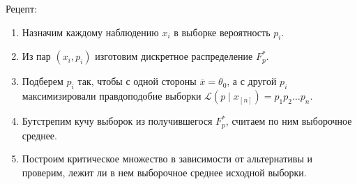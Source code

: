 \documentclass[11pt]{book}
\begin{document}
Рецепт:
\begin{enumerate}
	\item Назначим каждому наблюдению $x_i$ в выборке вероятность $p_i$.
	\item Из пар $(x_i, p_i)$ изготовим дискретное распределение $F^*_p$.
	\item Подберем $p_i$ так, чтобы с одной стороны $\overline{x} = \theta_0$, а с другой $p_i$ максимизировали правдоподобие выборки $\mathcal{L}(p \mid x_{[n]}) = p_1 p_2 \ldots p_{n}$.
	\item Бутстрепим кучу выборок из получившегося $F_{p}^{*}$, считаем по ним выборочное среднее.
	\item Построим критическое множество в зависимости от альтернативы и проверим, лежит ли в нем выборочное среднее исходной выборки.
\end{enumerate}
\end{document}
